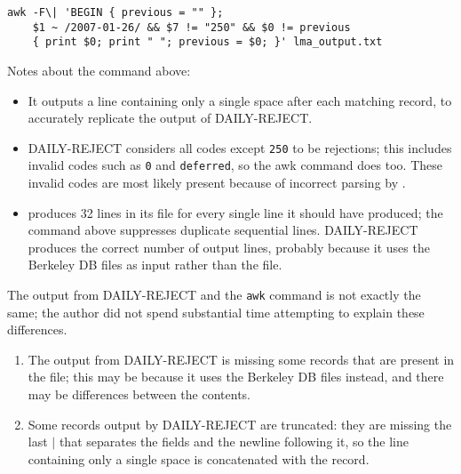 
\begin{verbatim}
awk -F\| 'BEGIN { previous = "" };
    $1 ~ /2007-01-26/ && $7 != "250" && $0 != previous
    { print $0; print " "; previous = $0; }' lma_output.txt
\end{verbatim}

Notes about the command above:

\begin{itemize}

    \item It outputs a line containing only a single space after each
        matching record, to accurately replicate the output of
        DAILY-REJECT\@.

    \item DAILY-REJECT considers all  codes except
        \texttt{250} to be rejections; this includes invalid 
        codes such as \texttt{0} and \texttt{deferred}, so the awk command
        does too.  These invalid  codes are most likely
        present because of incorrect parsing by .

    \item {} produces 32 lines in its  file for
        every single line it should have produced; the command above
        suppresses duplicate sequential lines.  DAILY-REJECT produces the
        correct number of output lines, probably because it uses the
        Berkeley DB files as input rather than the  file.

\end{itemize}

The output from DAILY-REJECT and the \texttt{awk} command is not exactly
the same; the author did not spend substantial time attempting to explain
these differences.

\begin{enumerate}

    \item The output from DAILY-REJECT is missing some records that are
        present in the  file; this may be because it uses the
        Berkeley DB files instead, and there may be differences between the
        contents.

    \item Some records output by DAILY-REJECT are truncated: they are
        missing the last $|$ that separates the fields and the newline
        following it, so the line containing only a single space is
        concatenated with the record.

\end{enumerate}

